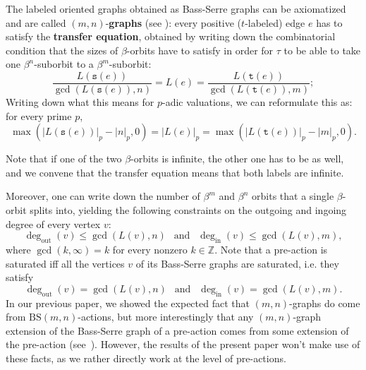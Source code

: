 \documentclass[12pt]{article}
\numberwithin{equation}{section}
\theoremstyle{definition}
\newcommand{\Z}{\mathbb{Z}}
\newcommand{\abs}[1]{\left\lvert #1\right\rvert}
\newcommand\BSo{\mathrm{BS}}
\newcommand\degout{\deg_{\mathrm{out}}}
\newcommand\degin{\deg_{\mathrm{in}}}
\newcommand{\source}{\mathtt{s}}
\newcommand{\target}{\mathtt{t}}
\begin{document}
The labeled oriented graphs obtained as Bass-Serre graphs can be axiomatized
and are called \((m,n)\)-\textbf{graphs} (see \cite[Definition~3.12]{CGLMS-22}): 
every positive (\(t\)-labeled) edge \( e \)  has to satisfy the \textbf{transfer equation},
obtained by writing down the combinatorial condition that the sizes of \( \beta \)-orbits have to satisfy in order for \( \tau \) to be able to take one \(\beta^n\)-suborbit to a \(\beta^m\)-suborbit:
\begin{equation}
	\label{eq:transfert}
	\frac{L(\source(e))}{\gcd(L(\source(e)),n)}=L(e)=\frac{L(\target(e))}{\gcd(L(\target(e)),m)};
\end{equation}
Writing down what this means for \(p\)-adic valuations, we can reformulate this as: for every prime \(p\),
\begin{equation}\label{eq:p adic transfert}
            \max(\abs{L(\source(e))}_p - \abs{n}_p,0)
            = \abs{L(e)}_p
            = \max(\abs{L(\target(e))}_p - \abs{m}_p, 0).
\end{equation}

Note that if one of the two \(\beta\)-orbits is infinite, the other one
has to be as well, and we convene that the transfer equation means that both 
labels are infinite.

Moreover, one can write down the number of \(\beta^m\) and \(\beta^n\) orbits that a 
single \( \beta \)-orbit splits into, yielding the following constraints on the outgoing
and ingoing degree of every vertex \( v \): 
\begin{equation}\label{eq: deg bound by gcd L(v), n m}
	\degout(v)\leq \gcd(L(v),n)\ \ \text{ and } \ \ \degin(v)\leq \gcd(L(v),m), 
\end{equation}
where \(\gcd(k,\infty)=k\) for every nonzero \( k\in\Z \).
Note that a pre-action is saturated iff all the vertices \(v\) of its Bass-Serre graphs
are saturated, i.e. they satisfy
\begin{equation}\label{eq: deg max for saturated}
	\degout(v)= \gcd(L(v),n)\ \ \text{ and } \ \ \degin(v)= \gcd(L(v),m).
\end{equation}
In our previous paper, we showed the expected fact that \((m,n)\)-graphs do 
come from \(\BSo(m,n)\)-actions, but more interestingly that 
any \((m,n)\)-graph extension of the Bass-Serre graph of a pre-action
comes from some extension of the pre-action (see~\cite[Thm.~4.13]{CGLMS-22}). 
However, the results of the present paper won't make use of these facts, 
as we rather directly work at the level of pre-actions.
\end{document}
